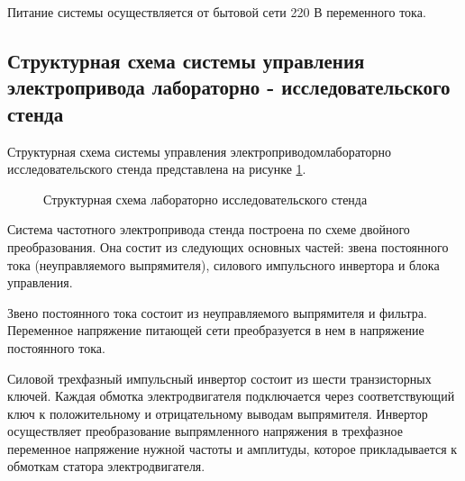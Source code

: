         Питание системы осуществляется от бытовой сети 220 В переменного тока.

    \subsection{Структурная схема системы управления электропривода
        лабораторно - исследовательского стенда}

        Структурная схема системы управления электроприводомлабораторно
        исследовательского стенда представлена на рисунке \ref{fig:struct}.

        \begin{figure}[h!]
            \caption{Структурная схема лабораторно исследовательского стенда}
            \label{fig:struct}
        \end{figure}

        Система частотного электропривода стенда построена по схеме
        двойного преобразования.  Она состит из следующих основных частей:
        звена  постоянного  тока  (неуправляемого выпрямителя), силового
        импульсного инвертора и блока управления.

        Звено постоянного тока состоит из неуправляемого выпрямителя и фильтра.
        Переменное напряжение питающей сети преобразуется в нем в напряжение
        постоянного тока.

        Силовой трехфазный импульсный инвертор состоит из шести транзисторных
        ключей. Каждая обмотка электродвигателя подключается через
        соответствующий ключ к положительному и отрицательному выводам
        выпрямителя. Инвертор осуществляет преобразование выпрямленного
        напряжения в трехфазное переменное напряжение нужной частоты и амплитуды,
        которое прикладывается к обмоткам статора электродвигателя.

